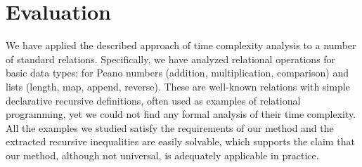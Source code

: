 \section{Evaluation}
\label{sec:evaluation}

We have applied the described approach of time complexity analysis to a number of standard \mK relations. Specifically, we have analyzed relational operations for basic data types: for Peano
numbers (addition, multiplication, comparison) and lists (length, map, append, reverse). These are well-known relations with simple declarative recursive definitions, often used as examples
of relational programming, yet we could not find any formal analysis of their time complexity. All the examples we studied satisfy the requirements of our method and the extracted recursive
inequalities are easily solvable, which supports the claim that our method, although not universal, is adequately applicable in practice.

